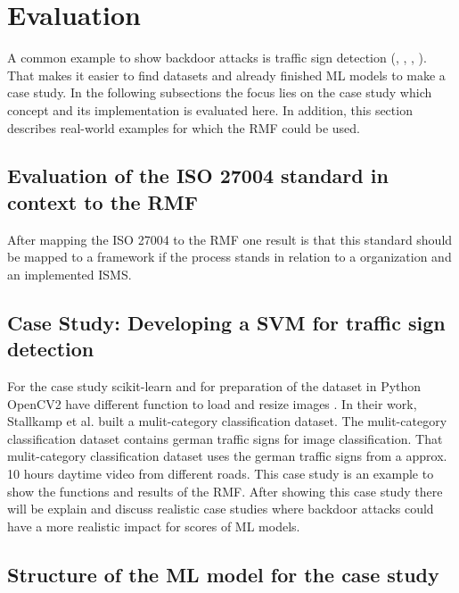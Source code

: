 \section{Evaluation}
\label{sec:evaluation}

A common example to show backdoor attacks is traffic sign detection (\cite{DBLP:journals/corr/abs-2102-10369}, \cite{DBLP:journals/corr/abs-1708-06733}, \cite{DBLP:conf/codaspy/NudingM20},
\cite{DBLP:journals/tdsc/LiXZZZ21}). That makes it easier to find datasets and already finished ML models to make a case study. In the following subsections the focus lies on the case study which concept and its implementation is evaluated here. In addition, this section describes real-world examples for which the RMF could be used.

\subsection{Evaluation of the ISO 27004 standard in context to the RMF}

After mapping the ISO 27004 to the RMF one result is that this standard should be mapped to a framework if the process stands in relation to a organization and an implemented ISMS.

\subsection{Case Study: Developing a SVM for traffic sign detection}

For the case study scikit-learn \cite{scikit-learn} and for preparation of the dataset in Python OpenCV2 have different function to load and resize images \cite{opencv_library}. In their work, Stallkamp et al. \cite{DBLP:conf/ijcnn/StallkampSSI11} built a mulit-category classification dataset. The mulit-category classification dataset contains german traffic signs for image classification. That mulit-category classification dataset uses the german traffic signs from a approx. 10 hours daytime video from different roads.
This case study is an example to show the functions and results of the RMF. After showing this case study there will be explain and discuss realistic case studies where backdoor attacks could have a more realistic impact for scores of ML models.

\subsection{Structure of the ML model for the case study}

